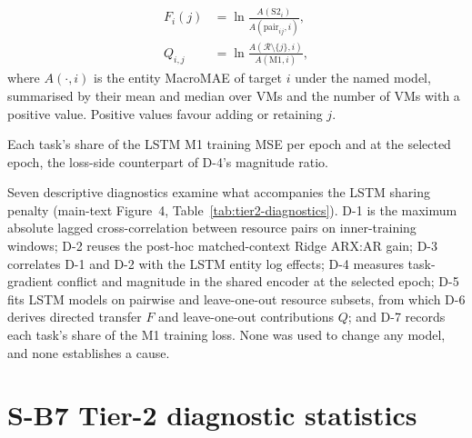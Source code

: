 \documentclass[a4paper,11pt]{article}
\begin{document}
\begin{description}
\begin{equation*}
\begin{aligned}
        F_i(j)&=\ln\frac{A(\mathrm{S2}_i)}{A(\mathrm{pair}_{ij},i)},\\
        Q_{i,j}&=\ln\frac{A(\mathcal{R}\setminus\{j\},i)}{A(\mathrm{M1},i)},
      \end{aligned}
    \end{equation*}
    where $A(\cdot,i)$ is the entity MacroMAE of target $i$ under the named
    model, summarised by their mean and median over VMs
    and the number of VMs with a positive value. Positive values favour
    adding or retaining $j$.
  \item[D-7, loss shares.] Each task's share of the LSTM M1 training MSE per
    epoch and at the selected epoch, the loss-side counterpart of D-4's
    magnitude ratio.
\end{description}

Seven descriptive diagnostics examine what accompanies the LSTM sharing
penalty (main-text Figure~4, Table~\ref{tab:tier2-diagnostics}).
D-1 is the maximum absolute lagged cross-correlation between resource pairs on
inner-training windows; D-2 reuses the post-hoc matched-context Ridge ARX:AR
gain; D-3 correlates D-1 and D-2 with the LSTM entity log effects; D-4
measures task-gradient conflict and magnitude in the shared encoder at the
selected epoch; D-5 fits LSTM models on pairwise and leave-one-out resource
subsets, from which D-6 derives directed transfer $F$ and leave-one-out
contributions $Q$; and D-7 records each task's share of the M1 training loss.
None was used to change any model, and none establishes a cause.

\clearpage
\section*{S-B7 Tier-2 diagnostic statistics}
\end{document}
